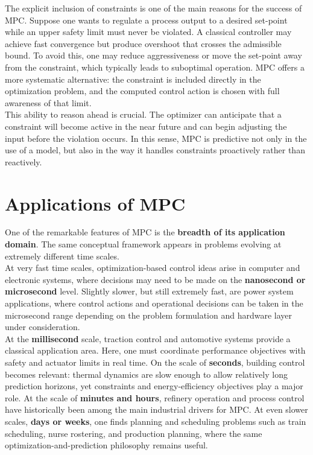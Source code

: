 The explicit inclusion of constraints is one of the main reasons for the success of MPC. Suppose one wants to regulate a process output to a desired set-point while an upper safety limit must never be violated. A classical controller may achieve fast convergence but produce overshoot that crosses the admissible bound. To avoid this, one may reduce aggressiveness or move the set-point away from the constraint, which typically leads to suboptimal operation. MPC offers a more systematic alternative: the constraint is included directly in the optimization problem, and the computed control action is chosen with full awareness of that limit.\\
This ability to reason ahead is crucial. The optimizer can anticipate that a constraint will become active in the near future and can begin adjusting the input before the violation occurs. In this sense, MPC is predictive not only in the use of a model, but also in the way it handles constraints proactively rather than reactively.

\section{Applications of MPC}

One of the remarkable features of MPC is the \textbf{breadth of its application domain}. The same conceptual framework appears in problems evolving at extremely different time scales.\\

At very fast time scales, optimization-based control ideas arise in computer and electronic systems, where decisions may need to be made on the \textbf{nanosecond or microsecond} level. Slightly slower, but still extremely fast, are power system applications, where control actions and operational decisions can be taken in the microsecond range depending on the problem formulation and hardware layer under consideration.\\
At the \textbf{millisecond} scale, traction control and automotive systems provide a classical application area. Here, one must coordinate performance objectives with safety and actuator limits in real time. On the scale of \textbf{seconds}, building control becomes relevant: thermal dynamics are slow enough to allow relatively long prediction horizons, yet constraints and energy-efficiency objectives play a major role. At the scale of \textbf{minutes and hours}, refinery operation and process control have historically been among the main industrial drivers for MPC. At even slower scales, \textbf{days or weeks}, one finds planning and scheduling problems such as train scheduling, nurse rostering, and production planning, where the same optimization-and-prediction philosophy remains useful.

